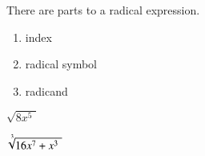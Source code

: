     There are  parts to a radical expression.\\
    \begin{minipage}{0.5\linewidth}
        \begin{enumerate}[itemsep=0pt]
            \item index
            \item radical symbol
            \item radicand
        \end{enumerate}
    \end{minipage}
    \hfill
    \begin{minipage}{0.24\linewidth}
    \begin{center}
        \Large
        \centering
            $\displaystyle \sqrt{8x^5\,\,}  $ \\
    \end{center}
    \end{minipage}
    \hfill
    \begin{minipage}{0.24\linewidth}
    \begin{center}
        \Large
        \centering
            $\displaystyle \sqrt[\uproot{4}\leftroot{-1}3]{16x^7+x^3\,\,}  $ \\
    \end{center}
    \end{minipage}
